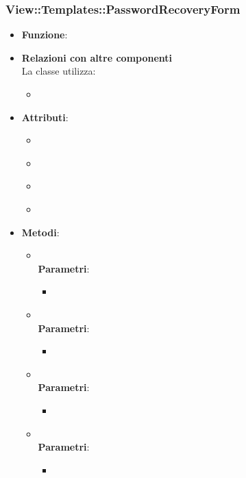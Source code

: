 \subsubsection{View::Templates::PasswordRecoveryForm}
\begin{itemize}
\item\textbf{Funzione}:
\item\textbf{Relazioni con altre componenti}\\
La classe utilizza:
	\begin{itemize}
		\item
	\end{itemize}
\item\textbf{Attributi}:
	\begin{itemize}
		\item\code{}\\
		\item\code{}\\
		\item\code{}\\
		\item\code{}\\
	\end{itemize}
\item\textbf{Metodi}:
	\begin{itemize}
		\item\code{}\\
		\textbf{Parametri}:
			\begin{itemize}
				\item\code{}\\
			\end{itemize}
		\item\code{}\\
		\textbf{Parametri}:
			\begin{itemize}
				\item\code{}\\
			\end{itemize}
		\item\code{}\\
		\textbf{Parametri}:
			\begin{itemize}
				\item\code{}\\
			\end{itemize}
		\item\code{}\\
		\textbf{Parametri}:
			\begin{itemize}
				\item\code{}\\
			\end{itemize}
	\end{itemize}
\end{itemize}

